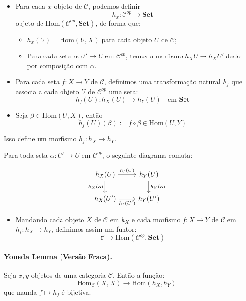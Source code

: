 \documentclass{article}
\theoremstyle{plain}                    %
\theoremstyle{definition}
\theoremstyle{remark}
\begin{document}
\begin{itemize}
    \item Para cada $x$ objeto de $\mathcal{C}$, podemos definir
    \[
    h_x : \mathcal{C}^{op} \to \mathbf{Set}
    \]
    objeto de $\text{Hom}(\mathcal{C}^{op}, \mathbf{Set})$, de forma que:
    \begin{itemize}
        \item $h_x(U) = \text{Hom}(U, X)$ para cada objeto $U$ de $\mathcal{C}$;
        \item Para cada seta $\alpha : U' \to U$ em $\mathcal{C}^{op}$, temos o morfismo $h_X U \to h_X U'$ dado por composição com $\alpha$.
    \end{itemize}
    
    \item Para cada seta $f : X \to Y$ de $\mathcal{C}$, definimos uma transformação natural $h_f$ que associa a cada objeto $U$ de $\mathcal{C}^{op}$ uma seta:
    \[
    h_f(U) : h_X(U) \to h_Y(U) \quad \text{em } \mathbf{Set}
    \]
    \item Seja $\beta \in \text{Hom}(U, X)$, então
    \[
    h_f(U)(\beta) := f \circ \beta \in \text{Hom}(U, Y)
    \]
\end{itemize}

Isso define um morfismo $h_f : h_X \to h_Y$.

Para toda seta $\alpha : U' \to U$ em $\mathcal{C}^{op}$, o seguinte diagrama comuta:

\[
\begin{tikzcd}
h_X(U) \arrow[r, "h_f(U)"] \arrow[d, "h_X(\alpha)"'] & h_Y(U) \arrow[d, "h_Y(\alpha)"] \\
h_X(U') \arrow[r, "h_f(U')"'] & h_Y(U')
\end{tikzcd}
\]

\begin{itemize}
    \item Mandando cada objeto $X$ de $\mathcal{C}$ em $h_X$ e cada morfismo $f : X \to Y$ de $\mathcal{C}$ em $h_f : h_X \to h_Y$, definimos assim um funtor:
    \[
    \mathcal{C} \to \text{Hom}(\mathcal{C}^{op}, \mathbf{Set})
    \]
\end{itemize}

\paragraph{Yoneda Lemma (Versão Fraca).} Seja $x, y$ objetos de uma categoria $\mathcal{C}$. Então a função:
\[
\text{Hom}_{\mathcal{C}}(X, X) \to \text{Hom}(h_X, h_Y)
\]
que manda $f \mapsto h_f$ é bijetiva.
\end{document}
